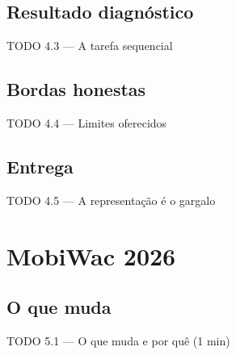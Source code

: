 \documentclass{beamer}
\begin{document}
\subsection{Resultado diagnóstico}
\begin{frame}{TODO 4.3 --- A tarefa sequencial}
\end{frame}

\subsection{Bordas honestas}
\begin{frame}{TODO 4.4 --- Limites oferecidos}
\end{frame}

\subsection{Entrega}
\begin{frame}{TODO 4.5 --- A representação é o gargalo}
\end{frame}


\section{MobiWac 2026}

\subsection{O que muda}
\begin{frame}{TODO 5.1 --- O que muda e por quê (1 min)}
\end{frame}
\end{document}
